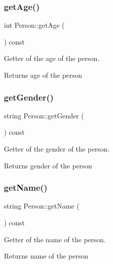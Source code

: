 \subsubsection{\texorpdfstring{get\+Age()}{getAge()}}
{\footnotesize\ttfamily int Person\+::get\+Age (\begin{DoxyParamCaption}{ }\end{DoxyParamCaption}) const}



Getter of the age of the person. 

\begin{DoxyReturn}{Returns}
age of the person 
\end{DoxyReturn}
\mbox{\label{class_person_a3abba7ffeabffb247ec36230df68cec4}} 
\subsubsection{\texorpdfstring{get\+Gender()}{getGender()}}
{\footnotesize\ttfamily string Person\+::get\+Gender (\begin{DoxyParamCaption}{ }\end{DoxyParamCaption}) const}



Getter of the gender of the person. 

\begin{DoxyReturn}{Returns}
gender of the person 
\end{DoxyReturn}
\mbox{\label{class_person_a9db2e2ccfc6cfa0d7979613ec2aaa922}} 
\subsubsection{\texorpdfstring{get\+Name()}{getName()}}
{\footnotesize\ttfamily string Person\+::get\+Name (\begin{DoxyParamCaption}{ }\end{DoxyParamCaption}) const}



Getter of the name of the person. 

\begin{DoxyReturn}{Returns}
name of the person 
\end{DoxyReturn}
\mbox{\label{class_person_af07a032df8d56dddade4dc43960b536b}} 
